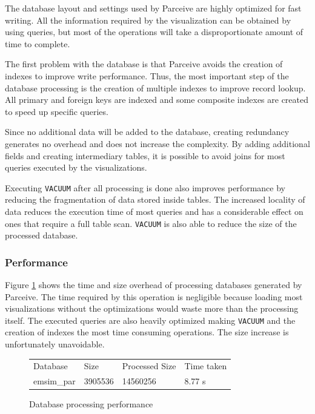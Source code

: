 \documentclass[conference]{IEEEtran}
\begin{document}
The database layout and settings used by Parceive are highly optimized for fast writing. All the information required by the visualization can be obtained by using queries, but most of the operations will take a disproportionate amount of time to complete.

The first problem with the database is that Parceive avoids the creation of indexes to improve write performance. Thus, the most important step of the database processing is the creation of multiple indexes to improve record lookup. All primary and foreign keys are indexed and some composite indexes are created to speed up specific queries.

Since no additional data will be added to the database, creating redundancy generates no overhead and does not increase the complexity. By adding additional fields and creating intermediary tables, it is possible to avoid joins for most queries executed by the visualizations. 

Executing \texttt{VACUUM} after all processing is done also improves performance by reducing the fragmentation of data stored inside tables. The increased locality of data reduces the execution time of most queries and has a considerable effect on ones that require a full table scan. \texttt{VACUUM} is also able to reduce the size of the processed database.

\subsubsection*{Performance}

Figure \ref{parceive:procperformance} shows the time and size overhead of processing databases generated by Parceive. The time required by this operation is negligible because loading most visualizations without the optimizations would waste more than the processing itself. The executed queries are also heavily optimized making \texttt{VACUUM} and the creation of indexes the most time consuming operations. The size increase is unfortunately unavoidable.

\begin{figure}
	\centering
	\begin{tabular}{l l l l}
		Database & Size & Processed Size & Time taken \\
		emsim\_par & 3905536 & 14560256 & 8.77 s
	\end{tabular}
	\caption{Database processing performance}
	\label{parceive:procperformance}
\end{figure}
\end{document}
